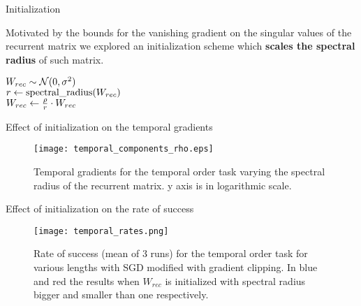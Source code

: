 \begin{frame}{Initialization}
	
Motivated by the bounds for the vanishing gradient on the singular values of the recurrent matrix we explored an initialization scheme which \textbf{scales the spectral radius} of such matrix.

\vspace{2em}

\begin{algorithm}[H]
	\BlankLine
	
	$W_{rec} \sim \mathcal{N}(0, \sigma^2)$\\
	$r \gets \mbox{spectral\_radius}(W_{rec})$\\
	$W_{rec}\gets \frac{\rho}{r} \cdot W_{rec}$\\
	\caption{Recurrent weight matrix initialization scheme}
	\label{algo:init_scaling}
\end{algorithm}
\end{frame}

\begin{frame}{Effect of initialization on the temporal gradients}
	\vspace{-3em}
	\begin{figure}[H]
		\texttt{[image: temporal\_components\_rho.eps]}
		\caption{Temporal gradients for the temporal order task varying the spectral radius of the recurrent matrix. y axis is in logarithmic scale.}
		\label{fig:temporal_norms}
	\end{figure}
\end{frame}

\begin{frame}{Effect of initialization on the rate of success}
	\begin{figure}
		\centering
		\texttt{[image: temporal\_rates.png]}
		\caption{Rate of success (mean of 3 runs) for the temporal order task for various lengths with SGD modified with gradient clipping. In blue and red the results when $W_{rec}$ is initialized with spectral radius bigger and smaller than one respectively.}
		\label{fig:temporal_rates}
	\end{figure}
\end{frame}


